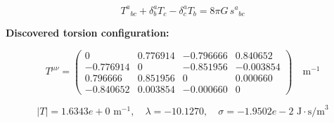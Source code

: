 
\begin{equation}
  T^a{}_{bc} + \delta^a_b T_c - \delta^a_c T_b = 8\pi G \, s^a{}_{bc}
\end{equation}

\textbf{Discovered torsion configuration:}

\begin{equation}
  T^{\mu\nu} = \begin{pmatrix}
    0 & 0.776914 & -0.796666 & 0.840652 \\
    -0.776914 & 0 & -0.851956 & -0.003854 \\
    0.796666 & 0.851956 & 0 & 0.000660 \\
    -0.840652 & 0.003854 & -0.000660 & 0
  \end{pmatrix} \quad \text{m}^{-1}
\end{equation}

\begin{equation}
  |T| = 1.6343e+0 \text{ m}^{-1}, \quad
  \lambda = -10.1270, \quad
  \sigma = -1.9502e-2 \text{ J}\cdot\text{s/m}^3
\end{equation}